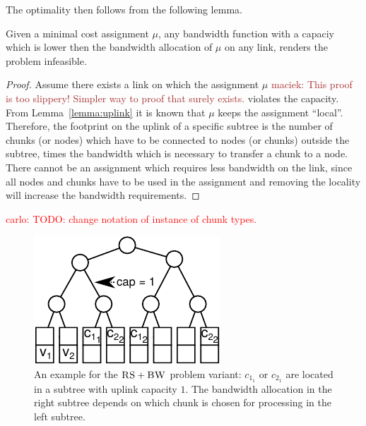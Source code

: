 \documentclass[9pt]{sigcomm-alternate}
\newcommand{\Problem}{\textsc{DummyName Problem}}
\newcommand{\carlo}[1]{\textcolor{red}{carlo: #1}}
\newcommand{\maciek}[1]{\textcolor{brown}{maciek: #1}}
\newcommand{\VmChunkAssignment}{\mu}
\newcommand{\achunk}{\ensuremath{c}}
\newcommand{\RS}{\textsc{RS}}
\newcommand{\BW}{\textsc{BW}}
\newcommand{\Sol}{\ensuremath{SOL}}
\begin{document}
The optimality then follows from the following lemma.
\begin{lemma}
Given a minimal cost assignment $\VmChunkAssignment$, 
any bandwidth function with a capaciy which is lower then the bandwidth 
allocation of $\VmChunkAssignment$ on any link, renders the 
problem infeasible.
\label{lemma:no_bandwidth}
\end{lemma}
\begin{proof}
Assume there exists a link on which the assignment $\VmChunkAssignment$
  \maciek{This proof is too slippery! Simpler way to proof that surely exists.}
violates the capacity. From Lemma~\ref{lemma:uplink} it is
known that $\VmChunkAssignment$ keeps the assignment ``local''. 
Therefore, the footprint on the uplink of a specific subtree is the number of chunks
(or nodes) which have to be connected to nodes (or chunks) outside the subtree,
times the bandwidth which is necessary to transfer a chunk to a node. There
cannot be an assignment which requires less bandwidth on the link, since all nodes
and chunks have to be used in the assignment and removing the
locality will increase the bandwidth requirements.
\end{proof}
%
%

\carlo{TODO: change notation of instance of chunk types.}

\begin{figure}
 \includegraphics[width = \columnwidth]{figs/matching_no_rs}
 \caption{An example for the $\RS+\BW$ problem variant: $\achunk_{1_1}$ or $\achunk_{2_1}$ are
located in a subtree with uplink capacity $1$. The bandwidth allocation in the right
subtree depends on which chunk is chosen for processing in the left
subtree.}
 \label{fig:matching_no_rs}
\end{figure}
\end{document}
